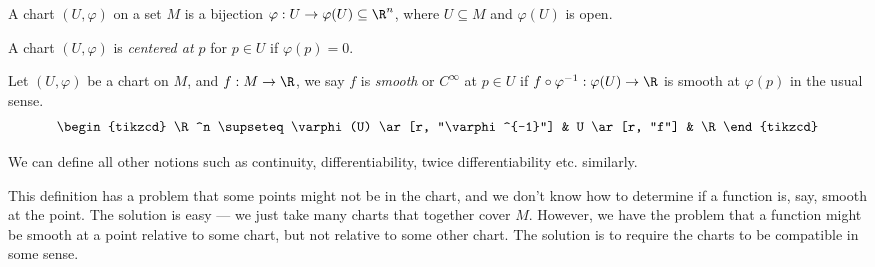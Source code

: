 \documentclass[a4paper]{article}
\begin{document}
\begin{defi}[Chart]
  A chart $(U, \varphi)$ on a set $M$ is a bijection $\varphi: U \to \varphi(U) \subseteq \R^n$, where $U \subseteq M$ and $\varphi(U)$ is open.

  A chart $(U, \varphi)$ is \emph{centered at $p$} for $p \in U$ if $\varphi(p) = 0$.
\end{defi}
\begin{center}
\end{center}

\begin{defi}
  Let $(U, \varphi)$ be a chart on $M$, and $f: M \to \R$, we say $f$ is \emph{smooth} or $C^\infty$ at $p \in U$ if $f \circ \varphi^{-1}: \varphi(U) \to \R$ is smooth at $\varphi(p)$ in the usual sense.
  \[
    \begin{tikzcd}
      \R^n \supseteq \varphi(U) \ar[r, "\varphi^{-1}"] & U \ar[r, "f"] & \R
    \end{tikzcd}
  \]
\end{defi}
We can define all other notions such as continuity, differentiability, twice differentiability etc. similarly.

This definition has a problem that some points might not be in the chart, and we don't know how to determine if a function is, say, smooth at the point. The solution is easy --- we just take many charts that together cover $M$. However, we have the problem that a function might be smooth at a point relative to some chart, but not relative to some other chart. The solution is to require the charts to be compatible in some sense.
\end{document}
